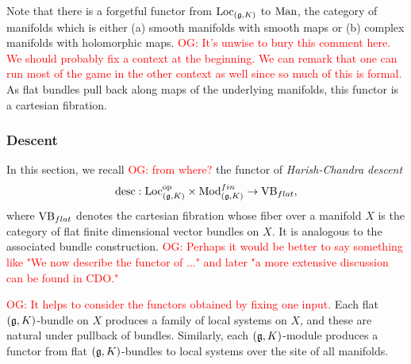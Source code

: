 \documentclass[10pt]{amsart}
\def\owen{\textcolor{red}{OG: }\textcolor{red}}
\begin{document}
Note that there is a forgetful functor from  ${\rm Loc}_{(\mathfrak g,K)}$ to ${\rm
  Man}$, the category of manifolds which is either (a) smooth manifolds
with smooth maps or (b) complex manifolds with holomorphic maps. 
\owen{It's unwise to bury this comment here. 
We should probably fix a context at the beginning. 
We can remark that one can run most of the game in the other context as well since so much of this is formal.}
As flat bundles pull back along maps of the underlying manifolds,
this functor is a cartesian fibration.

\subsubsection{Descent}


In this section, we recall \owen{from where?} the functor of {\em Harish-Chandra descent}
\[
{\rm desc}: {\rm Loc}_{(\mathfrak g,K)}^{{\rm op}} \times {\rm Mod}_{(\mathfrak g,K)}^{fin} \to {\rm VB}_{flat},
\]
where ${\rm VB}_{flat}$ denotes the cartesian fibration whose fiber
over a manifold $X$ is the category of flat finite dimensional vector
bundles on $X$. It is analogous to the associated bundle construction.
\owen{Perhaps it would be better to say something like "We now describe the functor of ..." and later "a more extensive discussion can be found in CDO."}

\owen{It helps to consider the functors obtained by fixing one input.}
Each flat $(\mathfrak g,K)$-bundle on $X$ produces a family of local systems on $X$, and 
these are natural under pullback of bundles.
Similarly, each $(\mathfrak g,K)$-module produces a functor from flat $(\mathfrak g,K)$-bundles to local systems over the site of all manifolds.

\end{document}
